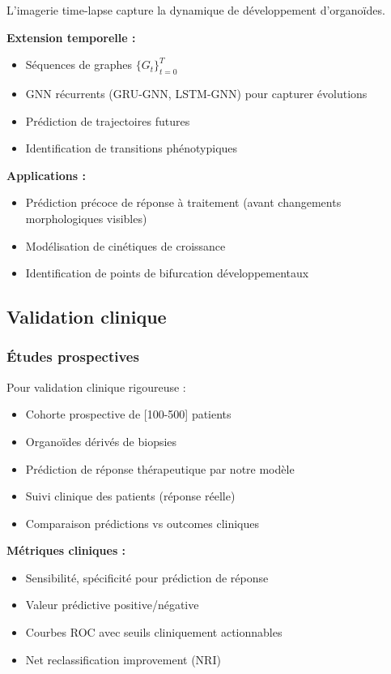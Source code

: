 L'imagerie time-lapse capture la dynamique de développement d'organoïdes.

\textbf{Extension temporelle :}
\begin{itemize}
    \item Séquences de graphes $\{G_t\}_{t=0}^T$
    \item GNN récurrents (GRU-GNN, LSTM-GNN) pour capturer évolutions
    \item Prédiction de trajectoires futures
    \item Identification de transitions phénotypiques
\end{itemize}

\textbf{Applications :}
\begin{itemize}
    \item Prédiction précoce de réponse à traitement (avant changements morphologiques visibles)
    \item Modélisation de cinétiques de croissance
    \item Identification de points de bifurcation développementaux
\end{itemize}

\subsection{Validation clinique}

\subsubsection{Études prospectives}

Pour validation clinique rigoureuse :
\begin{itemize}
    \item Cohorte prospective de [100-500] patients
    \item Organoïdes dérivés de biopsies
    \item Prédiction de réponse thérapeutique par notre modèle
    \item Suivi clinique des patients (réponse réelle)
    \item Comparaison prédictions vs outcomes cliniques
\end{itemize}

\textbf{Métriques cliniques :}
\begin{itemize}
    \item Sensibilité, spécificité pour prédiction de réponse
    \item Valeur prédictive positive/négative
    \item Courbes ROC avec seuils cliniquement actionnables
    \item Net reclassification improvement (NRI)
\end{itemize}

